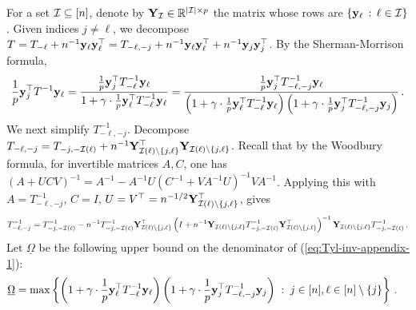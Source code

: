 \documentclass[times,sort&compress,3p]{elsarticle}
\begin{document}
For a set $\mathcal{I}\subseteq [n]$, denote by ${\bf Y}_{\mathcal{I}}\in \mathbb{R}^{|\mathcal{I}|\times p}$ the matrix whose rows are $\{{\bf y}_\ell\,:\,\ell \in \mathcal{I}\}$.
Given indices $j \ne \ell$, we decompose $T=T_{-\ell} + n^{-1}{\bf y}_\ell{\bf y}_\ell^\top = T_{-\ell,-j} + n^{-1}{\bf y}_\ell{\bf y}_\ell^\top + n^{-1}{\bf y}_j{\bf y}_j^\top$.
By the Sherman-Morrison formula, 
\begin{equation}
    \label{eq:Tyl-inv-appendix-1}
    \frac{1}{p}{\bf y}_j^\top T^{-1}{\bf y}_\ell = \frac{\frac{1}{p}{\bf y}_j^\top T_{-\ell}^{-1} {\bf y}_\ell}{1 + \gamma\cdot \frac{1}{p}{\bf y}_\ell^\top T_{-\ell}^{-1}{\bf y}_\ell}
= \frac{\frac{1}{p}{\bf y}_j^\top T_{-\ell,-j}^{-1} {\bf y}_\ell}{\left(1 + \gamma\cdot \frac{1}{p}{\bf y}_\ell^\top T_{-\ell}^{-1}{\bf y}_\ell\right)\left(1 + \gamma\cdot \frac{1}{p}{\bf y}_j^\top T_{-\ell,-j}^{-1}{\bf y}_j\right)}\,.
\end{equation}
We next simplify $T_{-\ell,-j}^{-1}$. Decompose $T_{-\ell,-j} = T_{-j,-\mathcal{I}(\ell)} +  n^{-1}{\bf Y}_{\mathcal{I}(\ell)\setminus\{j,\ell\}}^\top {\bf Y}_{\mathcal{I}(\ell)\setminus\{j,\ell\}}$. Recall that by the Woodbury formula, 
for invertible matrices $A,C$, one has $\left(A+UCV\right)^{-1}  = A^{-1} - A^{-1}U\left(C^{-1} + VA^{-1}U\right)^{-1}VA^{-1}$. Applying this with $A=T_{-\ell,-j}^{-1}$, $C=I$, $U=V^\top=n^{-1/2}{\bf Y}_{\mathcal{I}(\ell)\setminus\{j,\ell\}}^\top$, gives
\begin{equation}
    \begin{split}
        \label{eq:Tyl-inv-appendix-2}
         T_{-\ell,-j}^{-1} =  T_{-j,-\mathcal{I}(\ell)}^{-1} - n^{-1}T_{-j,-\mathcal{I}(\ell)}^{-1} {\bf Y}_{\mathcal{I}(\ell)\setminus\{j,\ell\}}^\top  \left(I + n^{-1}{\bf Y}_{\mathcal{I}(\ell)\setminus\{j,\ell\}} T_{-j,-\mathcal{I}(\ell)}^{-1} {\bf Y}_{\mathcal{I}(\ell)\setminus\{j,\ell\}}^\top  \right)^{-1} {\bf Y}_{\mathcal{I}(\ell)\setminus\{j,\ell\}} T_{-j,-\mathcal{I}(\ell)}^{-1}\,.
    \end{split}
\end{equation}
Let $\underline{\Omega}$ be the following upper bound on the denominator of (\ref{eq:Tyl-inv-appendix-1}):
\begin{equation}\label{eq:Tyl-Omegas-1}
\begin{split}
        \underline{\Omega} &= \max\left\{ \left(1 + \gamma\cdot \frac{1}{p}{\bf y}_\ell^\top T_{-\ell}^{-1}{\bf y}_\ell\right)\left(1 + \gamma\cdot \frac{1}{p}{\bf y}_j^\top T_{-\ell,-j}^{-1}{\bf y}_j\right)\;:\;j\in [n],\ell\in[n]\setminus\{j\} \right\} \,.
\end{split}
\end{equation}
\end{document}
